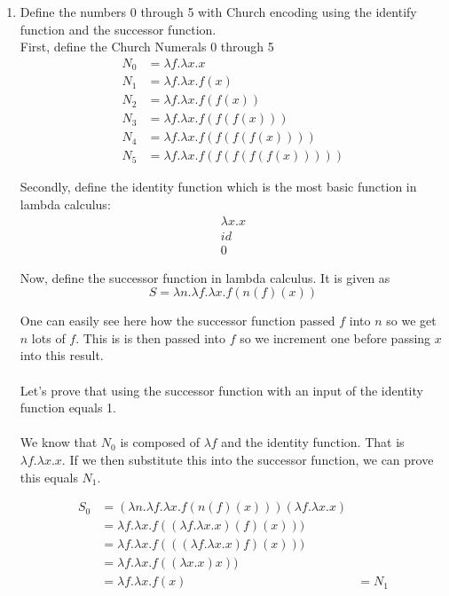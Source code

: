 \documentclass{article}
\begin{document}
\begin{enumerate}
    \item Define the numbers 0 through 5 with Church encoding using the identify function and the successor function.\\
    \color{blue}
    First, define the Church Numerals 0 through 5
        \begin{align}
            N_0 &= \lambda f.\lambda x.x    \\
            N_1 &= \lambda f.\lambda x.f(x)    \\
            N_2 &= \lambda f.\lambda x.f(f(x))    \\
            N_3 &= \lambda f.\lambda x.f(f(f(x)))    \\
            N_4 &= \lambda f.\lambda x.f(f(f(f(x))))    \\
            N_5 &= \lambda f.\lambda x.f(f(f(f(f(x)))))
        \end{align}

    Secondly, define the identity function which is the most basic function in lambda calculus:
    \begin{align}
        \lambda x.x \\
        id \\
        0
    \end{align}

    Now, define the successor function in lambda calculus. It is given as
    \[S = \lambda n.\lambda f.\lambda x.f \left(n (f) (x)\right)\]

    One can easily see here how the successor function passed \(f\) into \(n\) so we get \(n\) lots of \(f\). This is is then passed into \(f\) so we increment one before passing \(x\) into this result.\\
    \\
    Let's prove that using the successor function with an input of the identity function equals 1.\\
    \\
    We know that \(N_0\) is composed of \(\lambda f\) and the identity function. That is \(\lambda f.\lambda x.x\). If we then substitute this into the successor function, we can prove this equals \(N_1\).
    
    \begin{align}
        S_0 &= (\lambda n.\lambda f.\lambda x.f (n (f) (x)))(\lambda f.\lambda x.x) \\
        &=\lambda f.\lambda x.f ((\lambda f.\lambda x.x) (f) (x))) \\
        &=\lambda f.\lambda x.f (((\lambda f.\lambda x.x) f) (x))) \\
        &=\lambda f.\lambda x.f ((\lambda x.x) x)) \\
        &=\lambda f.\lambda x.f(x) &= N_1
    \end{align}
    

\end{enumerate}
\end{document}
